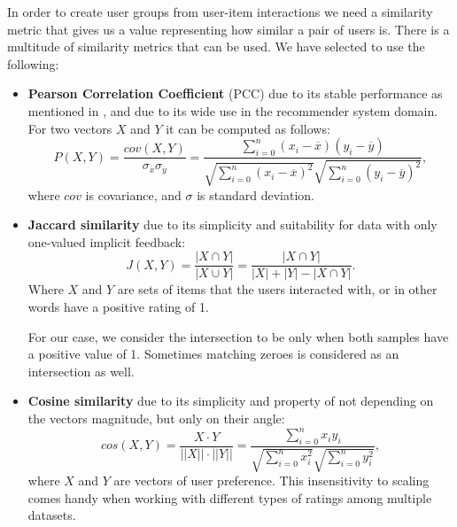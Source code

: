 In order to create user groups from user-item interactions we need a similarity metric that gives us a value representing how similar a pair of users is. There is a multitude of similarity metrics that can be used. We have selected to use the following: 
\begin{itemize}
    \item 
        \textbf{Pearson Correlation Coefficient} (PCC) due to its stable performance as mentioned in \cite{similarity_measures_comparason}, and due to its wide use in the recommender system domain.
        For two vectors $X$ and $Y$ it can be computed as follows:
        \begin{equation}
            P(X,Y) = \frac{cov(X,Y)}{\sigma_x \sigma_y}
            = \frac{\sum\limits_{i=0}^{n} (x_i - \overline{x})(y_i - \overline{y})}{\sqrt{\sum\limits_{i=0}^{n} (x_i - \overline{x})^2}\sqrt{\sum\limits_{i=0}^{n}(y_i - \overline{y})^2}},
        \end{equation}
        where $cov$ is covariance, and $\sigma$ is standard deviation.
        
        
    \item
        \textbf{Jaccard similarity} due to its simplicity and suitability for data with only one-valued implicit feedback:
        \begin{equation}
            J(X,Y) = \frac{|X \cap Y|}{|X \cup Y|} = \frac{|X \cap Y|}{|X| + |Y| - |X \cap Y|}.
        \end{equation}
        Where $X$ and $Y$ are sets of items that the users interacted with, or in other words have a positive rating of 1.
        
        For our case, we consider the intersection to be only when both samples have a positive value of 1. Sometimes matching zeroes is considered as an intersection as well.
        
    \item
        \textbf{Cosine similarity} due to its simplicity and property of not depending on the vectors magnitude, but only on their angle:
        \begin{equation}
            cos(X, Y) = \frac {X \cdot Y}{||X|| \cdot ||Y||}
             = \frac{\sum\limits_{i=0}^{n}{x_i y_i}} {\sqrt{\sum\limits_{i=0}^{n}{x_i^2}}\sqrt{\sum\limits_{i=0}^{n}{y_i^2}}}
            ,
        \end{equation}
        where $X$ and $Y$ are vectors of user preference.
        This insensitivity to scaling comes handy when working with different types of ratings among multiple datasets.
\end{itemize}

